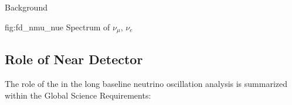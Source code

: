 Background

\begin{dunefigure}[$\nu_\mu$,$\nu_e$ at \dword{fd}]{fig:fd_nmu_nue}
{Spectrum of $\nu_\mu$, $\nu_e$}
\end{dunefigure}


\subsection{Role of Near Detector}
\label{intro:science:role}


The role of the  in the long baseline neutrino oscillation analysis is summarized within the  Global Science Requirements:

